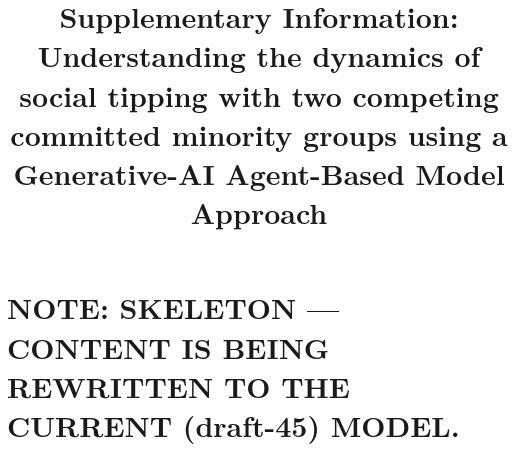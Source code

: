 \documentclass[pdflatex,sn-mathphys-num]{sn-jnl}%
\theoremstyle{thmstyleone}%
\theoremstyle{thmstyletwo}%
\theoremstyle{thmstylethree}%
\renewcommand{\thesection}{S\arabic{section}}
\renewcommand{\thetable}{S\arabic{table}}
\begin{document}
\title[Supplementary Information]{
Supplementary Information: Understanding the dynamics of social tipping with two competing
committed minority groups using a Generative-AI Agent-Based Model Approach}

\author*[1]{ }

\author*[1]{ }

\author[1]{ }

\author[1]{ }


\maketitle


\section*{NOTE: SKELETON --- CONTENT IS BEING REWRITTEN TO THE CURRENT (draft-45) MODEL.}


\end{document}
